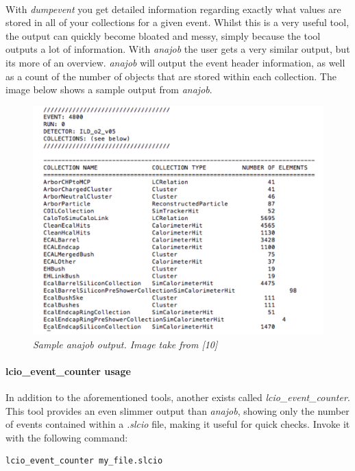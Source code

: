 \documentclass[11pt]{article}
\begin{document}
\paragraph{}
With \textit{dumpevent} you get detailed information regarding exactly what values are stored in all of your collections for a given event. Whilst this is a very useful tool, the output can quickly become bloated and messy, simply because the tool outputs a lot of information. With \textit{anajob} the user gets a very similar output, but its more of an overview. \textit{anajob} will output the event header information, as well as a count of the number of objects that are stored within each collection. The image below shows a sample output from \textit{anajob}.
\begin{figure}[!ht]
	\centering
	\includegraphics[scale=0.4]{images/anajob.png}
	\caption{\textit{Sample anajob output. Image take from [10]}}
\end{figure}
\paragraph{lcio\_event\_counter usage}
In addition to the aforementioned tools, another exists called \textit{lcio\_event\_counter}. This tool provides an even slimmer output than \textit{anajob}, showing only the number of events contained within a \textit{.slcio} file, making it useful for quick checks. Invoke it with the following command:
\begin{verbatim}
lcio_event_counter my_file.slcio
\end{verbatim}
\end{document}
